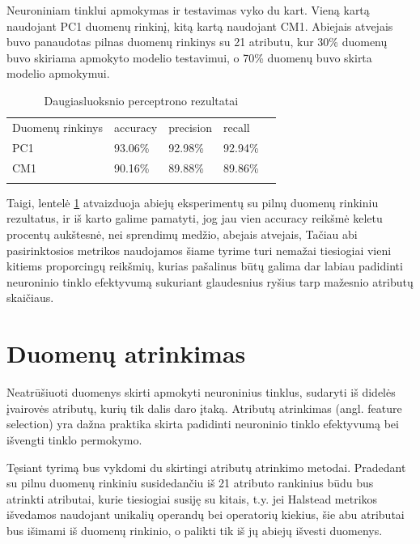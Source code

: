 \documentclass{VUMIFPSbakalaurinis}
\begin{document}
Neuroniniam tinklui apmokymas ir testavimas vyko du kart. Vieną kartą naudojant PC1 duomenų rinkinį, kitą kartą naudojant CM1. Abiejais atvejais buvo panaudotas pilnas duomenų rinkinys su 21 atributu, kur 30\% duomenų buvo skiriama apmokyto modelio testavimui, o 70\% duomenų buvo skirta modelio apmokymui.

\begin{table}[H]\footnotesize
\centering
\caption{Daugiasluoksnio perceptrono rezultatai}
\label{tab:MLP_result}
\begin{tabular}{lllll}
\cline{1-4}
\multicolumn{1}{|l}{Duomenų rinkinys} & accuracy & precision & \multicolumn{1}{l|}{recall} &  \\ \cline{1-4}
\multicolumn{1}{|l}{PC1}              & 93.06\%   & 92.98\%     & \multicolumn{1}{l|}{92.94\%} &  \\
\multicolumn{1}{|l}{CM1}              & 90.16\%    & 89.88\%     & \multicolumn{1}{l|}{89.86\%}  &  \\ \cline{1-4}
                                      &          &           &                             & 
\end{tabular}
\end{table}

Taigi, lentelė \ref{tab:MLP_result} atvaizduoja abiejų eksperimentų su pilnų duomenų rinkiniu rezultatus, ir iš karto galime pamatyti, jog jau vien accuracy reikšmė keletu procentų aukštesnė, nei sprendimų medžio, abejais atvejais, Tačiau abi pasirinktosios metrikos naudojamos šiame tyrime turi nemažai tiesiogiai vieni kitiems proporcingų reikšmių, kurias pašalinus būtų galima dar labiau padidinti neuroninio tinklo efektyvumą sukuriant glaudesnius ryšius tarp mažesnio atributų skaičiaus.

\section{Duomenų atrinkimas}

Neatrūšiuoti duomenys skirti apmokyti neuroninius tinklus, sudaryti iš didelės įvairovės atributų, kurių tik dalis daro įtaką. Atributų atrinkimas (angl. feature selection) yra dažna praktika skirta padidinti neuroninio tinklo efektyvumą bei išvengti tinklo permokymo.

Tęsiant tyrimą bus vykdomi du skirtingi atributų atrinkimo metodai. Pradedant su pilnu duomenų rinkiniu susidedančiu iš 21 atributo rankinius būdu bus atrinkti atributai, kurie tiesiogiai susiję su kitais, t.y. jei Halstead metrikos išvedamos naudojant unikalių operandų bei operatorių kiekius, šie abu atributai bus išimami iš duomenų rinkinio, o palikti tik iš jų abiejų išvesti duomenys.
\end{document}
